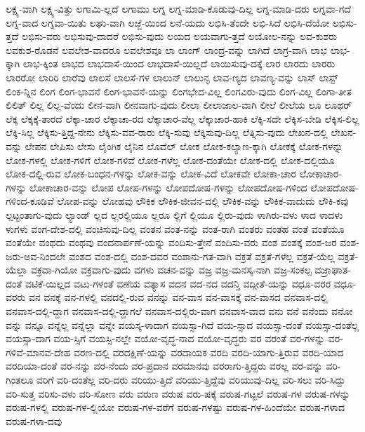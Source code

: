 {ಲಕ್ಷ್ಯ-ವಾಗಿ
ಲಕ್ಷ್ಯ-ವಿತ್ತು
ಲಗಾಮಿ-ಲ್ಲದೆ
ಲಗಾಮು
ಲಗ್ನ
ಲಗ್ನ-ಮಾಡಿ-ಕೊಡುವು-ದಿಲ್ಲ
ಲಗ್ನ-ಮಾಡಿ-ದರು
ಲಗ್ನವಾ-ಗದೆ
ಲಗ್ನ-ವಾದ
ಲಗ್ನವಾ-ಯಿತು
ಲಘು-ವಾಗಿ
ಲಜ್ಜೆ-ಯಿಂದ
ಲನೆ-ಯದು
ಲಭಿಸಿ-ತೆಂದೇ
ಲಭಿ-ಸಿದೆ
ಲಭಿಸಿ-ದೆಯೋ
ಲಭಿಸು-ತ್ತದೆ
ಲಭಿಸು-ವರು
ಲಭಿಸುವು-ದಾದರೆ
ಲಭಿಸು-ವುದು
ಲಯದ
ಲಯವಾಗು-ತ್ತದೆ
ಲಯೋಲ-ನನ್ನು
ಲವ-ಕುಶರು
ಲವಕುಶ-ರೊಡನೆ
ಲವಲೇಶ-ವಾದರೂ
ಲವಲೇಶವೂ
ಲಾ
ಲಾಂಗ್
ಲಾಂದ್ರ-ವನ್ನು
ಲಾಗಿದೆ
ಲಾಗ್ರ-ವಾಗಿ
ಲಾಭ
ಲಾಭ-ಕ್ಕಾಗಿ
ಲಾಭ-ಕ್ಕಿಂತ
ಲಾಭದ
ಲಾಭದಾಸೆ-ಯಿಂದ
ಲಾಭದಾಸೆ-ಯಿಲ್ಲದೆ
ಲಾಯಿಸುವು-ದಕ್ಕೆ
ಲಾರ
ಲಾರದು
ಲಾರರು
ಲಾರರೋ
ಲಾರಿರಿ
ಲಾರೆವು
ಲಾಲಸೆ
ಲಾಲಸೆ-ಗಳ
ಲಾಲುನ್
ಲಾಲುನ್ಳ
ಲಾವ-ಣ್ಯದ
ಲಾವಣ್ಯ-ವನ್ನು
ಲಾಸ್
ಲಾಸ್ಟ್
ಲಿಂಕ-ನ್ನಿನ
ಲಿಂಗ
ಲಿಂಗ-ಭಾವನೆ
ಲಿಂಗ-ಭಾವನೆ-ಯನ್ನು
ಲಿಂಗಭೇದ-ವಿಲ್ಲ
ಲಿಂಗವಿರು-ವುದು
ಲಿಂಗ-ವಿಲ್ಲ
ಲಿಂಗಾ-ತೀತ
ಲಿಲಿತ್
ಲಿಲ್ಲ
ಲಿಲ್ಲ-ವೆಂದು
ಲೀನ-ವಾಗಿ
ಲೀನವಾಗು-ವುದು
ಲೀಲಾ
ಲೀಲಾಜಾಲ-ವಾಗಿ
ಲೀಲೆ
ಲೀಲೆಯ
ಲೂ
ಲೂಥರ್
ಲೆಕ್ಕ
ಲೆಕ್ಕಕ್ಕೆ-ತಾರದೆ
ಲೆಕ್ಕಾ-ಚಾರ
ಲೆಕ್ಕಾಚಾ-ರದ
ಲೆಕ್ಕಾಚಾರ-ವೆಲ್ಲ
ಲೆಕ್ಕಾಚಾರ-ಹಾಕಿ
ಲೆಕ್ಕಿ-ಸದೇ
ಲೆಕ್ಕಿಸ-ಬೇಡಿ
ಲೆಕ್ಕಿಸ-ಲಿಲ್ಲ
ಲೆಕ್ಕಿ-ಸಿಲ್ಲ
ಲೆಕ್ಕಿಸು-ತ್ತಿದ್ದ-ನೇನು
ಲೆಕ್ಕಿಸು-ವವ-ರಾರು
ಲೆಕ್ಕಿ-ಸುವು
ಲೆಕ್ಕಿಸುವು-ದಿಲ್ಲ
ಲೆತ್ನಿಸು-ವುದು
ಲೇಖನ-ದಲ್ಲಿ
ಲೇಖನ-ವನ್ನು
ಲೇಪನ
ಲೇಪಿಸು
ಲೇಸು
ಲೈಂಗಿಕ
ಲೈನಿನ
ಲೊವೆಲ್
ಲೋಕ
ಲೋಕ-ಕಲ್ಯಾಣ-ಕ್ಕಾಗಿ
ಲೋಕಕ್ಕೆ
ಲೋಕ-ಗಳನ್ನು
ಲೋಕ-ಗಳಲ್ಲಿ
ಲೋಕ-ಗಳಿಗೆ
ಲೋಕ-ಗಳಿವೆ
ಲೋಕ-ಗಳೆಲ್ಲ
ಲೋಕ-ದಂತೆಯೇ
ಲೋಕ-ದಲ್ಲಿ
ಲೋಕ-ದಲ್ಲಿಯೂ
ಲೋಕ-ದಲ್ಲಿ-ರುವ
ಲೋಕ-ಬಂಧನ-ಗಳನ್ನು
ಲೋಕ-ವನ್ನು
ಲೋಕ-ವಿದೆ
ಲೋಕವೇ
ಲೋಕಾ-ಚಾರ
ಲೋಕಾಚಾರ-ಗಳನ್ನು
ಲೋಕಾಚಾರ-ವನ್ನು
ಲೋಪ
ಲೋಪ-ಗಳನ್ನು
ಲೋಪದೋಷ-ಗಳನ್ನು
ಲೋಪದೋಷ-ಗಳಿಂದ
ಲೋಪದೋಷ-ಗಳಿಂದ-ಕೂಡಿವೆ
ಲೋಪ-ವನ್ನು
ಲೋಹವು
ಲೌಕಿಕ
ಲೌಕಿಕ-ಜೀವನ-ದಲ್ಲಿ
ಲೌಕಿಕ-ವನ್ನು
ಲೌಕಿಕ-ವಾದುದು
ಲೌಕಿ-ಕವು
ಲ್ಪಟ್ಟಂತಾಗು-ವುದು
ಲ್ಯಾಂಡ್
ಲ್ಲದ
ಲ್ಲರಲ್ಲಿಯೂ
ಲ್ಲರೂ
ಲ್ಲಿಗೆ
ಲ್ಲಿಯೂ
ಲ್ಲಿರು-ವುದು
ಳಾಗಿರು-ವಳು
ಳಾದ
ಳಾದಳು
ಳುಗಳು
ವಂಗ-ದೇಶ-ದಲ್ಲಿ
ವಂಚಿಸುವು-ದಿಲ್ಲ
ವಂತನ
ವಂತ-ನನ್ನು
ವಂತ-ರಾಗಿ
ವಂತರು
ವಂತಹ
ವಂತೆ
ವಂತೆಯೂ
ವಂತೆಯೇ
ವಂಥದು
ವಂಥವು
ವಂದನಾರ್ಪಣೆ-ಯನ್ನು
ವಂದಿಸು-ತ್ತೇನೆ
ವಂದಿಸು-ವರು
ವಂಶ
ವಂಶಕ್ಕೆ
ವಂಶ-ಜರ
ವಂಶ-ಜರು-ಅವ-ನಿಂದಲೇ
ವಂಶದ
ವಂಶ-ದಲ್ಲಿ
ವಂಶ-ದವರ
ವಂಶಾನು-ಗತ-ವಾಗಿ
ವಕ್ರತೆ
ವಕ್ರತೆ-ಗಳೆಲ್ಲ
ವಕ್ರತೆ-ಯೆಲ್ಲ
ವಕ್ರತೆ-ಯೆಲ್ಲಾ
ವಕ್ರವಾ-ಗಿಯೋ
ವಕ್ರವಾಗು-ವುದು
ವಗಳು
ವಚನ-ವನ್ನು
ವಜ್ರ
ವಜ್ರ-ಮನಸ್ಕ-ನಾಗಿ
ವಜ್ರ-ಸಂಕಲ್ಪ
ವಜ್ರಾಘಾತ-ದಂತೆ
ವಟಿಕೆ-ಯಿಲ್ಲದ
ವಟು-ಗಳಂತೆ
ವಣೆಯ
ವತ್ಯಾಸ
ವದನ
ವದ-ನದ
ವದನ್ತಿ
ವದ್ಗೀತೆ-ಯನ್ನು
ವಧೂ-ವರರ
ವಧೂ-ವರರು
ವನ
ವನಕ್ಕೆ
ವನ-ಗಳಲ್ಲಿ
ವನದಲ್ಲಿ-ರುವ
ವನನ್ನು
ವನ-ವಾಸ
ವನ-ವಾಸಕ್ಕೆ
ವನ-ವಾಸದ
ವನವಾಸ-ದಲ್ಲಿ
ವನವಾಸ-ದಲ್ಲಿ-ದ್ದಾಗ
ವನವಾಸ-ದಲ್ಲಿ-ದ್ದಾಗಲೆ
ವನವಾಸ-ದಲ್ಲಿರು-ವಾಗ
ವನವಾಸ-ವಾದ
ವನು
ವನೆ
ವನೆಂದು
ವನೋ
ವನ್ನು
ವನ್ನೂ
ವನ್ನೆಲ್ಲ
ವನ್ನೆಲ್ಲಾ
ವನ್ನೇ
ವಯಸ್ಕ-ಳಾದಾಗ
ವಯಸ್ಸಾ-ಗಿದೆ
ವಯ-ಸ್ಸಾದ
ವಯಸ್ಸಾ-ದಂತೆ
ವಯಸ್ಸಾ-ದಂತೆಲ್ಲ
ವಯಸ್ಸಾ-ದಾಗ
ವಯ-ಸ್ಸಿಗೆ
ವಯಸ್ಸಿ-ನಲ್ಲೇ
ವಯೋ-ವೃದ್ಧ-ನಾದ
ವಯೋ-ವೃದ್ಧರು
ವರ
ವರಂತೆ
ವರ-ಗಳನ್ನು
ವರ-ಗಳಿವೆ-ಮಾನವ-ದೇಹ
ವರಣ-ದಲ್ಲಿ
ವರದಕ್ಷಿಣೆ-ಯನ್ನು
ವರದಾಯಕ
ವರದಿ
ವರದಿ-ಯಾಗು-ತ್ತಿರುವ
ವರದಿ-ಯಾದ
ವರದಿಯಾ-ದಂತೆ
ವರ-ನನ್ನು
ವರ-ನೆಂದು
ವರ-ಪ್ರದಾನ
ವರಮಾನವು
ವರರಾಗು-ತ್ತಿದ್ದರು
ವರಲ್ಲ
ವರ-ವನ್ನು
ವರಿ-ಗಿಂತಲೂ
ವರಿಗೆ
ವರಿ-ದಂತೆಲ್ಲ
ವರಿ-ದರು
ವರಿಯು-ತ್ತಿದೆ
ವರಿಯು-ತ್ತಿದ್ದೆವು
ವರಿಯುವು-ದಿಲ್ಲ
ವರಿ-ಸಲು
ವರಿ-ಸಿದ್ದು
ವರಿ-ಸುತ್ತ
ವರಿಸು-ವಳು
ವರಿ-ಸೋಣ
ವರು
ವರುಣ
ವರುಷ
ವರು-ಷಕ್ಕೆ
ವರುಷ-ಗಟ್ಟಲೆ
ವರುಷ-ಗಳ
ವರುಷ-ಗಳನ್ನು
ವರುಷ-ಗಳಲ್ಲಿ
ವರುಷ-ಗಳ-ಲ್ಲಿಯೋ
ವರುಷ-ಗಳ-ವರೆಗೆ
ವರುಷ-ಗಳಷ್ಟು
ವರುಷ-ಗಳ-ಹಿಂದೆಯೇ
ವರುಷ-ಗಳಾದ
ವರುಷ-ಗಳಾ-ದವು
}
